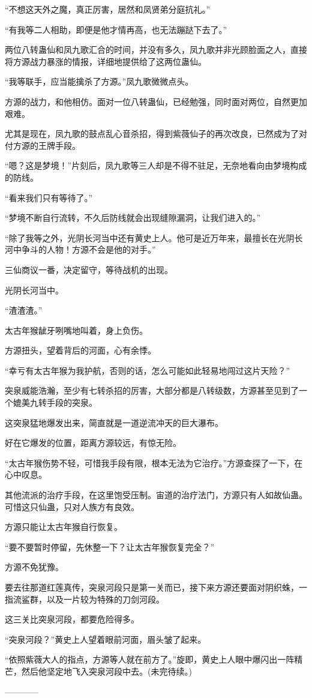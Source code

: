 \begin{this_body}
“不想这天外之魔，真正厉害，居然和凤贤弟分庭抗礼。”

“有我等二人相助，即便是他才情再高，也无法蹦跶下去了。”

两位八转蛊仙和凤九歌汇合的时间，并没有多久，凤九歌并非光顾脸面之人，直接将方源战力暴涨的情报，详细地提供给了这两位蛊仙。

“我等联手，应当能擒杀了方源。”凤九歌微微点头。

方源的战力，和他相仿。面对一位八转蛊仙，已经勉强，同时面对两位，自然更加艰难。

尤其是现在，凤九歌的鼓点乱心音杀招，得到紫薇仙子的再次改良，已然成为了对付方源的王牌手段。

“嗯？这是梦境！”片刻后，凤九歌等三人却是不得不驻足，无奈地看向由梦境构成的防线。

“看来我们只有等待了。”

“梦境不断自行流转，不久后防线就会出现缝隙漏洞，让我们进入的。”

“除了我等之外，光阴长河当中还有黄史上人。他可是近万年来，最擅长在光阴长河中争斗的人物！方源不会是他的对手。”

三仙商议一番，决定留守，等待战机的出现。

光阴长河当中。

“渣渣渣。”

太古年猴龇牙咧嘴地叫着，身上负伤。

方源扭头，望着背后的河面，心有余悸。

“幸亏有太古年猴为我护航，否则的话，怎么可能如此轻易地闯过这片天险？”

突泉威能浩瀚，至少有七转杀招的厉害，大部分都是八转级数，方源甚至见到了一个媲美九转手段的突泉。

这突泉猛地爆发出来，简直就是一道逆流冲天的巨大瀑布。

好在它爆发的位置，距离方源较远，有惊无险。

“太古年猴伤势不轻，可惜我手段有限，根本无法为它治疗。”方源查探了一下，在心中叹息。

其他流派的治疗手段，在这里饱受压制。宙道的治疗法门，方源只有人如故仙蛊。可惜这只仙蛊，只对人族方有良效。

方源只能让太古年猴自行恢复。

“要不要暂时停留，先休整一下？让太古年猴恢复完全？”

方源不免犹豫。

要去往那道红莲真传，突泉河段只是第一关而已，接下来方源还要面对阴织蛛，一指流鲨群，以及一片较为特殊的刀剑河段。

这三关比突泉河段，都要危险得多。

“突泉河段？”黄史上人望着眼前河面，眉头皱了起来。

“依照紫薇大人的指点，方源等人就在前方了。”旋即，黄史上人眼中爆闪出一阵精芒，然后他坚定地飞入突泉河段中去。(未完待续。)

------------

\end{this_body}

